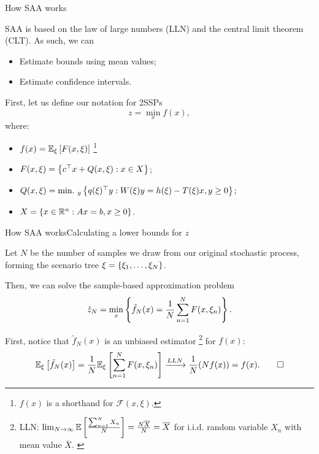 \begin{frame}{How SAA works}

	SAA is based on the \alert{law of large numbers} (LLN) and the \alert{central limit theorem} (CLT). As such, we can
	\vspace{-6pt} 
	\begin{itemize}
		\item Estimate bounds using mean values;
		\item Estimate confidence intervals.
	\end{itemize}
	
	\pause 
	First, let us define our notation for \alert{2SSP}s
	\begin{equation*}
		z = \min_x f(x), 	
	\end{equation*}
	where: 
	\begin{itemize}
		\item $f(x) = \mathbb{E}_\xi\left[ F(x, \xi) \right]$%
		\footnote{$f(x)$ is a shorthand for $\mathcal{F}(x,\xi)$.}
		\item $F(x,\xi) = \left\{ c^\top x + Q(x,\xi) : x \in X \right \}$;
		\item $Q(x, \xi) = \mathop{\text{min.} \ }_y \left\{ q(\xi)^\top y : W(\xi)y = h(\xi) - T(\xi)x, y \ge 0 \right \}$;
		\item $X=\left\{ x \in \mathbb R^n : Ax = b, x \ge 0 \right \}$.	
	\end{itemize}
	
\end{frame}


\begin{frame}{How SAA works}{Calculating a lower bounds for $z$}

	Let $N$ be the number of samples we draw from our original stochastic process, forming the \alert{scenario tree} $\xi = \left\{ \xi_1, \dots, \xi_N \right \}$.
	
	Then, we can solve the \alert{sample-based approximation} problem
	\begin{equation}
		\hat{z}_N = \min_x \left\{ \tilde{f}_N(x) = \frac{1}{N}\sum_{n=1}^N F(x,\xi_n) \right \}.
	\end{equation}
	
	\pause
	First, notice that $\tilde{f}_N(x)$ is an \alert{unbiased estimator}%
	\footnote{LLN: $\lim_{N \rightarrow \infty} \mathbb{E}\left[ \frac{\sum_{n=1}^N X_n}{N} \right] = \frac{N \overline{X}}{N} = \overline{X}$ for i.i.d. random variable $X_n$ with mean value $\overline{X}$. \label{fn:unbiased_estimator}} 
	for $f(x)$:
	\begin{equation*}
		\mathbb{E}_\xi\left[ \tilde{f}_N(x) \right] = \frac{1}{N}\mathbb{E}_\xi\left[ \sum_{n=1}^N F(x,\xi_n) \right] \xrightarrow{LLN} \frac{1}{N} (Nf(x)) = f(x).	\qed
	\end{equation*}

\end{frame}



